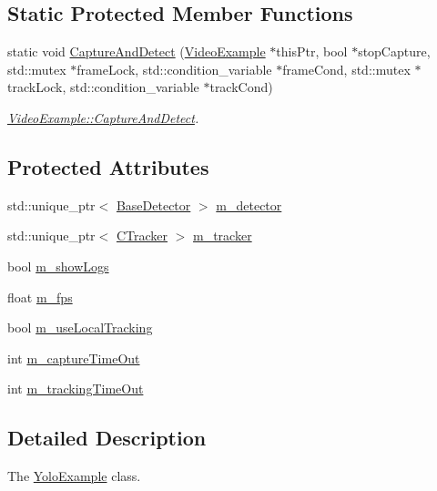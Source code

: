 \subsection*{Static Protected Member Functions}
\begin{DoxyCompactItemize}
\item 
static void \mbox{\hyperlink{class_video_example_ace8617201da40b6e230bd6c049b48aa0}{Capture\+And\+Detect}} (\mbox{\hyperlink{class_video_example}{Video\+Example}} $\ast$this\+Ptr, bool $\ast$stop\+Capture, std\+::mutex $\ast$frame\+Lock, std\+::condition\+\_\+variable $\ast$frame\+Cond, std\+::mutex $\ast$track\+Lock, std\+::condition\+\_\+variable $\ast$track\+Cond)
\begin{DoxyCompactList}\small\item\em \mbox{\hyperlink{class_video_example_ace8617201da40b6e230bd6c049b48aa0}{Video\+Example\+::\+Capture\+And\+Detect}}. \end{DoxyCompactList}\end{DoxyCompactItemize}
\subsection*{Protected Attributes}
\begin{DoxyCompactItemize}
\item 
std\+::unique\+\_\+ptr$<$ \mbox{\hyperlink{class_base_detector}{Base\+Detector}} $>$ \mbox{\hyperlink{class_video_example_a00fee4b18b68d605b87051f3bdaa1c92}{m\+\_\+detector}}
\item 
std\+::unique\+\_\+ptr$<$ \mbox{\hyperlink{class_c_tracker}{C\+Tracker}} $>$ \mbox{\hyperlink{class_video_example_a7c58cd8c883981b2e645d1a3d8edf76a}{m\+\_\+tracker}}
\item 
bool \mbox{\hyperlink{class_video_example_af3bfe51e3e1452bb084016602c668463}{m\+\_\+show\+Logs}}
\item 
float \mbox{\hyperlink{class_video_example_ae8110012f8d57f39d6355377cf20fb27}{m\+\_\+fps}}
\item 
bool \mbox{\hyperlink{class_video_example_a951ee017c4fbb180dfc965a9a35ac69f}{m\+\_\+use\+Local\+Tracking}}
\item 
int \mbox{\hyperlink{class_video_example_aea3c9dd66a3464fab8c61a838aff0ccf}{m\+\_\+capture\+Time\+Out}}
\item 
int \mbox{\hyperlink{class_video_example_a47c8dd1d6ec7e8e18a8f7d92536c53a2}{m\+\_\+tracking\+Time\+Out}}
\end{DoxyCompactItemize}


\subsection{Detailed Description}
The \mbox{\hyperlink{class_yolo_example}{Yolo\+Example}} class. 


